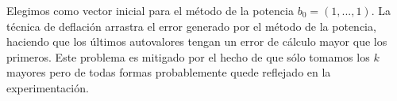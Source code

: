 Elegimos como vector inicial para el método de la potencia $b_0 = (1,...,1)$. La técnica de deflación arrastra el error generado por el método de la potencia, haciendo que los últimos autovalores tengan un error de cálculo 
mayor que los primeros. Este problema es mitigado por el hecho de que sólo tomamos los $k$ mayores pero de todas formas probablemente quede 
reflejado en la experimentación.





